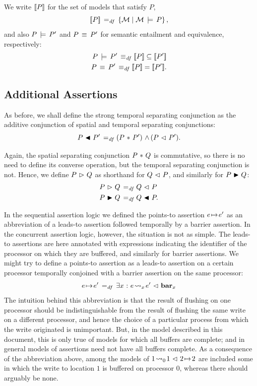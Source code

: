\documentclass[11pt]{report}
\begin{document}
We write $[\![P]\!]$ for the set of models that satisfy $P$,\[ [\![P]\!] \operatorname{\;=_{\mathit{df}}\;} \left\lbrace \mathcal{M} \mid \mathcal{M} \,\models\, P \right\rbrace,\] and also $P \,\models\, P'$ and $P \,\equiv\, P'$ for semantic entailment and equivalence, respectively: \begin{align*}
	P \sentails P' \iffdef \pred{P} \subseteq \pred{P'} \\
	P \sequiv P' \iffdef \pred{P} = \pred{P'}.
\end{align*} 


\subsection{Additional Assertions} 

As before, we shall define the strong temporal separating conjunction as the additive conjunction of spatial and temporal separating conjunctions: \[ P \operatorname{\,\blacktriangleleft\,} P' \operatorname{\;=_{\mathit{df}}\;} (P \operatorname{\,\ast\,} P') \operatorname{\,\wedge\,} (P \operatorname{\,\vartriangleleft\,} P').\]

Again, the spatial separating conjunction $P \operatorname{\,\ast\,} Q$ is commutative, so there is no need to define its converse operation, but the temporal separating conjunction is not. Hence, we define $P \operatorname{\,\vartriangleright\,} Q$ as shorthand for $Q \operatorname{\,\vartriangleleft\,} P$, and similarly for $P \operatorname{\,\blacktriangleright\,} Q$: \begin{align*}
  P \operatorname{\,\vartriangleright\,} Q \operatorname{\;=_{\mathit{df}}\;} & Q \operatorname{\,\vartriangleleft\,} P \\ 
  P \operatorname{\,\blacktriangleright\,} Q \operatorname{\;=_{\mathit{df}}\;} & Q \operatorname{\,\blacktriangleleft\,} P. \\ 
\end{align*}

In the sequential assertion logic we defined the points-to assertion $e \!\mapsto\! e'$ as an abbreviation of a leads-to assertion followed temporally by a barrier assertion. In the concurrent assertion logic, however, the situation is not as simple. The leads-to assertions are here annotated with expressions indicating the identifier of the processor on which they are buffered, and similarly for barrier assertions. We might try to define a points-to assertion as a leads-to assertion on a certain processor temporally conjoined with a barrier assertion on the same processor: \[
  e \!\mapsto\! e' \operatorname{\;=_{\mathit{df}}\;} \exists x \operatorname{\,:\,} e \!\leadsto_{x}\! e' \operatorname{\,\vartriangleleft\,} \mathbf{bar}_{x}
\] The intuition behind this abbreviation is that the result of flushing on one processor should be indistinguishable from the result of flushing the same write on a different processor, and hence the choice of a particular process from which the write originated is unimportant. But, in the model described in this document, this is only true of models for which all buffers are complete; and in general models of assertions need not have all buffers complete. As a consequence of the abbreviation above, among the models of $1 \!\leadsto_{0}\! 1 \operatorname{\,\vartriangleleft\,} 2 \!\mapsto\! 2$ are included some in which the write to location $1$ is buffered on processor 0, whereas there should arguably be none. 
\end{document}
